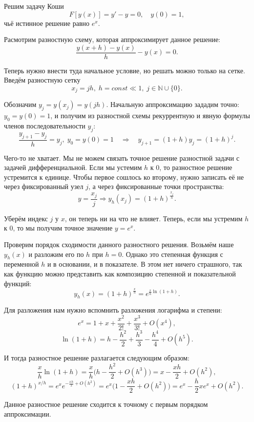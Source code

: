 \documentclass[../main.tex]{subfile}
\begin{document}
\begin{example}
	Решим задачу Коши
	\[F[y(x)]=y'-y=0,\quad y(0)=1,\]
	чьё истинное решение равно $e^x$.

	Расмотрим разностную схему, которая аппроксимирует данное решение:
	\[\frac{y(x+h)-y(x)}{h}-y(x)=0.\]

	Теперь нужно внести туда начальное условие, но решать можно только
	на сетке. Введём разностную сетку
	\[x_j=jh,\;h=const\ll 1,\;j\in\mathbb N\cup\{0\}.\]

	Обозначим $y_j=y(x_j)=y(jh)$. Начальную аппроксимацию зададим точно:
	$y_0=y(0)=1$, и получим из разностной схемы рекуррентную и явную формулы
	членов последовательности $y_j$:
	\[\frac{y_{j+1}-y_j}{h}=y_j,\;y_0=y(0)=1\quad\Rightarrow\quad y_{j+1}=
	(1+h)y_j=(1+h)^j.\]

	Чего-то не хватает. Мы не можем связать точное решение разностной задачи
	с задачей дифференциальной. Если мы устемим $h$ к 0, то разностное
	решение устремится к единице. Чтобы первое сошлось ко второму, нужно
	записать её не через фиксированный узел $j$, а через фиксированные
	точки пространства:
	\[y=\frac{x_j}{j}\Rightarrow y_h(x_j)=(1+h)^\frac{x_j}{h}.\]

	Уберём индекс $j$ у $x$, он теперь ни на что не влияет. Теперь, если мы
	устремим $h$ к 0, то мы получим точное значение $y=e^x$.

	Проверим порядок сходимости данного разностного решения. Возьмём наше
	$y_h(x)$ и разложим его по $h$ при $h=0$. Однако это степенная функция
	с переменной $h$ и в основании, и в показателе. В этом нет ничего
	страшного, так как функцию можно представить как композицию степенной
	и показательной функций:
	\[y_h(x)=(1+h)^\frac{x}{h}=e^{\frac{x}{h}\ln(1+h)}.\]

	Для разложения нам нужно вспомнить разложения логарифма и степени:
	\[e^x=1+x+\frac{x^2}{2!}+\frac{x^3}{3!}+O(x^4),\]
	\[\ln(1+h)=h-\frac{h^2}{2}+\frac{h^3}{3}-\frac{h^4}{4}+O(h^5).\]

	И тогда разностное решение разлагается следующим образом:
	\[\frac{x}{h}\ln(1+h)=\frac{x}{h}\big(h-\frac{h^2}{2}
	+O(h^3)\big)=x-\frac{xh}{2}+O(h^2),\]
	\[(1+h)^{x/h}=e^xe^{-\frac{xh}{2}+O(h^2)}=e^x\big(1-\frac{xh}{2}+
	O(h^2)\big)=e^x-\frac{h}{2}xe^x+O(h^2).\]

	Данное разностное решение сходится к точному с первым порядком
	аппроксимации.
\end{example}
\end{document}
